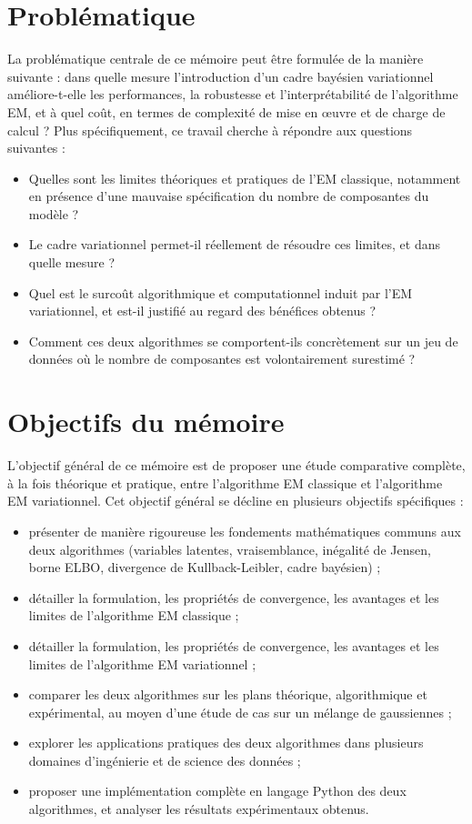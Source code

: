 \section*{Problématique}
La problématique centrale de ce mémoire peut être formulée de la manière suivante : dans quelle mesure l'introduction d'un cadre bayésien variationnel améliore-t-elle les performances, la robustesse et l'interprétabilité de l'algorithme EM, et à quel coût, en termes de complexité de mise en œuvre et de charge de calcul ? Plus spécifiquement, ce travail cherche à répondre aux questions suivantes :

\begin{itemize}
\item Quelles sont les limites théoriques et pratiques de l'EM classique, notamment en présence d'une mauvaise spécification du nombre de composantes du modèle ?
\item Le cadre variationnel permet-il réellement de résoudre ces limites, et dans quelle mesure ?
\item Quel est le surcoût algorithmique et computationnel induit par l'EM variationnel, et est-il justifié au regard des bénéfices obtenus ?
\item Comment ces deux algorithmes se comportent-ils concrètement sur un jeu de données où le nombre de composantes est volontairement surestimé ?
\end{itemize}
\section*{Objectifs du mémoire}
L'objectif général de ce mémoire est de proposer une étude comparative complète, à la fois théorique et pratique, entre l'algorithme EM classique et l'algorithme EM variationnel. Cet objectif général se décline en plusieurs objectifs spécifiques :

\begin{itemize}
\item présenter de manière rigoureuse les fondements mathématiques communs aux deux algorithmes (variables latentes, vraisemblance, inégalité de Jensen, borne ELBO, divergence de Kullback-Leibler, cadre bayésien) ;
\item détailler la formulation, les propriétés de convergence, les avantages et les limites de l'algorithme EM classique ;
\item détailler la formulation, les propriétés de convergence, les avantages et les limites de l'algorithme EM variationnel ;
\item comparer les deux algorithmes sur les plans théorique, algorithmique et expérimental, au moyen d'une étude de cas sur un mélange de gaussiennes ;
\item explorer les applications pratiques des deux algorithmes dans plusieurs domaines d'ingénierie et de science des données ;
\item proposer une implémentation complète en langage Python des deux algorithmes, et analyser les résultats expérimentaux obtenus.
\end{itemize}
